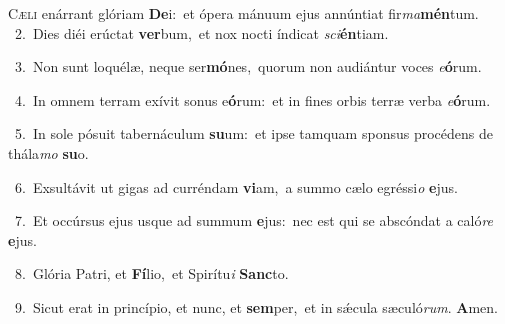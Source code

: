 \lettrine{\initial\textcolor{\initialcolor}{C}}{æli} enárrant glóriam \textbf{De}\-i:~\star et ópera mánuum ejus annúntiat fir\-\textit{ma}\-\textbf{mén}tum.\\
{\numbfont\textcolor{\numbcolor}{~2.}}~Dies diéi erúctat \textbf{ver}\-bum,~\star et nox nocti índicat \textit{sci}\-\textbf{én}tiam.\par
{\numbfont\textcolor{\numbcolor}{~3.}}~Non sunt loquélæ, neque ser\-\textbf{mó}\-nes,~\star quorum non audiántur voces \textit{e}\-\textbf{ó}rum.\par
{\numbfont\textcolor{\numbcolor}{~4.}}~In omnem terram exívit sonus e\-\textbf{ó}\-rum:~\star et in fines orbis terræ verba \textit{e}\-\textbf{ó}rum.\par
{\numbfont\textcolor{\numbcolor}{~5.}}~In sole pósuit tabernáculum \textbf{su}\-um:~\star et ipse tamquam sponsus procédens de thála\textit{mo} \textbf{su}\-o.\par
{\numbfont\textcolor{\numbcolor}{~6.}}~Exsultávit ut gigas ad curréndam \textbf{vi}\-am,~\star a summo cælo egréssi\textit{o} \textbf{e}\-jus.\par
{\numbfont\textcolor{\numbcolor}{~7.}}~Et occúrsus ejus usque ad summum \textbf{e}\-jus:~\star nec est qui se abscóndat a caló\textit{re} \textbf{e}\-jus.\par
{\numbfont\textcolor{\numbcolor}{~8.}}~Glória Patri, et \textbf{Fí}\-lio,~\star et Spirítu\textit{i} \textbf{Sanc}\-to.\par
{\numbfont\textcolor{\numbcolor}{~9.}}~Sicut erat in princípio, et nunc, et \textbf{sem}\-per,~\star et in sǽcula sæculó\-\textit{rum}\-. \textbf{A}\-men.\par
